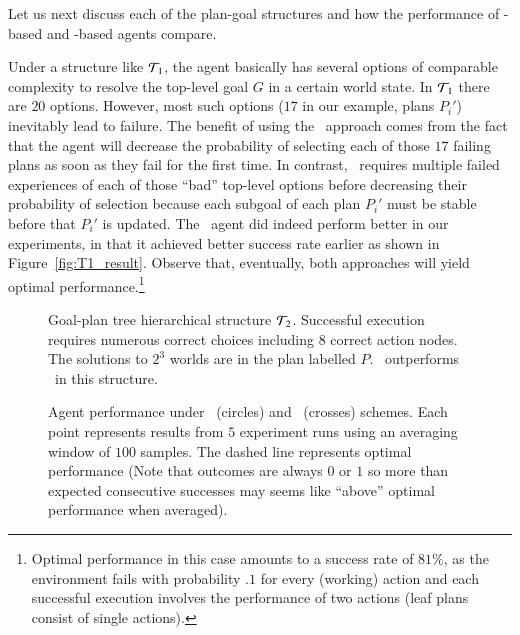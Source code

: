 
Let us next discuss each of the plan-goal structures and how the performance of
\BUL-based and \CL-based agents compare.


Under a structure like $\T_1$, the agent basically has several options of
comparable complexity to resolve the top-level goal $G$ in a certain
world state. In $\T_1$ there are $20$ options.
However, most such options ($17$ in our example, plans $P_i'$)
inevitably lead to failure.  
The benefit of using the \CL\ approach comes from the fact that the agent will
decrease the probability of selecting each of those $17$ failing plans as soon as
they fail for the first time. In contrast, \BUL\ requires multiple failed
experiences of each of those ``bad'' top-level options before decreasing their
probability of selection because each subgoal of each plan $P_i'$ must
be stable before that $P_i'$ is updated. 
The \CL\ agent did indeed perform better in our experiments, in that it
achieved better success rate earlier as shown in Figure~\ref{fig:T1_result}.
Observe that, eventually, both approaches will yield optimal
performance.\footnote{Optimal performance in this case amounts to a success rate
of $81\%$, as the environment fails with probability $.1$ for every (working) action and each
successful execution involves the performance of two actions (leaf plans consist
of single actions).}


\begin{figure}[t]
\begin{center}

\end{center}
\caption{Goal-plan tree hierarchical structure $\T_2$. Successful execution requires numerous correct choices including $8$ correct action nodes. The solutions to $2^3$ worlds are in the plan labelled $P$. \BUL\ outperforms \CL\ in this structure.}
\label{fig:T2}
\end{figure}


\begin{figure*}[t]
\begin{center}
\subfigure[Structure $\T_1$]{\label{fig:T1_result}

}
\qquad
\subfigure[Structure $\T_2$]{\label{fig:T2_result}

}
\qquad
\subfigure[Structure $\T_3$]{\label{fig:T3_result}

}
\caption{Agent performance under \BUL\ (circles) and \CL\ (crosses) schemes.
Each point represents results from $5$ experiment runs using an averaging window
of $100$ samples. The dashed line represents optimal performance (Note that
outcomes are always $0$ or $1$ so more than expected consecutive successes may
seems like ``above'' optimal performance when averaged).}
\end{center}
\end{figure*}


